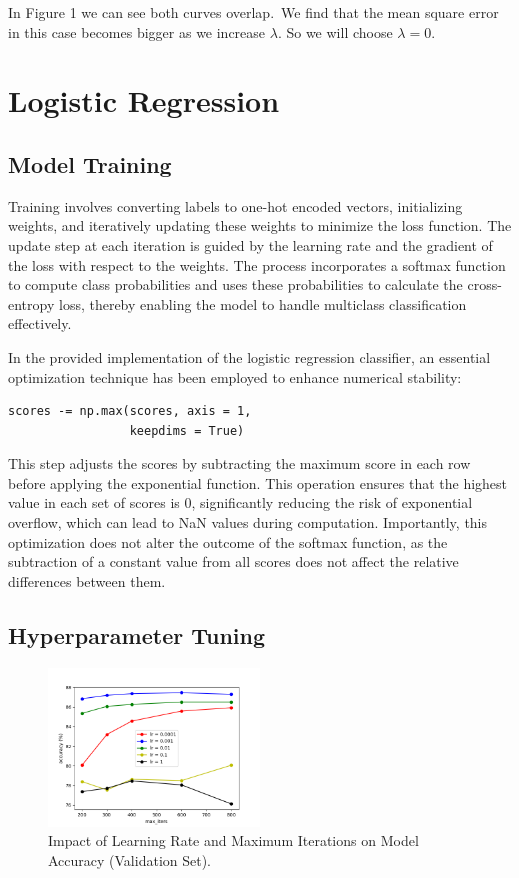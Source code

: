 \documentclass[10pt,twocolumn]{article}
\begin{document}
In Figure 1 we can see both curves overlap.\
We find that the mean square error in this case becomes bigger as we increase \(\lambda\).
So we will choose \(\lambda = 0\).

\section{Logistic Regression}

\subsection{Model Training}
Training involves converting labels to one-hot encoded vectors, initializing weights, and iteratively updating these weights to minimize the loss function. The update step at each iteration is guided by the learning rate and the gradient of the loss with respect to the weights. The process incorporates a softmax function to compute class probabilities and uses these probabilities to calculate the cross-entropy loss, thereby enabling the model to handle multiclass classification effectively. 

In the provided implementation of the logistic regression classifier, an essential optimization technique has been employed to enhance numerical stability:

\begin{lstlisting}
scores -= np.max(scores, axis = 1, 
                 keepdims = True)
\end{lstlisting}

This step adjusts the scores by subtracting the maximum score in each row before applying the exponential function. This operation ensures that the highest value in each set of scores is 0, significantly reducing the risk of exponential overflow, which can lead to NaN values during computation. Importantly, this optimization does not alter the outcome of the softmax function, as the subtraction of a constant value from all scores does not affect the relative differences between them.


\subsection{Hyperparameter Tuning}

\begin{figure}[htbp]
\centering
\includegraphics[width=0.5\textwidth]{LogisticRegression.png}
\caption{Impact of Learning Rate and Maximum Iterations on Model Accuracy (Validation Set). }
\label{fig:image2}
\end{figure} \
\end{document}
